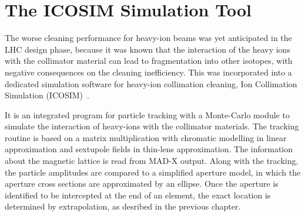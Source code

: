 










\section{The ICOSIM Simulation Tool}

The worse cleaning performance for heavy-ion beams was yet anticipated in the LHC design phase, because it was known that the interaction of the heavy ions with the collimator material can lead to fragmentation into other isotopes, with negative consequences on the cleaning inefficiency. This was incorporated into a dedicated simulation software for heavy-ion collimation cleaning, Ion Collimation Simulation (ICOSIM)~\cite{ICOSIMref02,ICOSIMref01}. 

It is an integrated program for particle tracking with a Monte-Carlo module to simulate the interaction of heavy-ions with the collimator materials. The tracking routine is based on a matrix multiplication with chromatic modelling in linear approximation and sextupole fields in thin-lens approximation. The information about the magnetic lattice is read from MAD-X output. Along with the tracking, the particle amplitudes are compared to a simplified aperture model, in which the aperture cross sections are approximated by an ellipse. Once the aperture is identified to be intercepted at the end of an element, the exact location is determined by extrapolation, as desribed in the previous chapter. 

